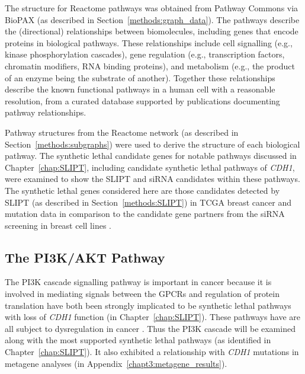 The  structure for Reactome \glspl{pathway} was obtained from Pathway Commons via \gls{BioPAX} (as described in Section~\ref{methods:graph_data}). The \glspl{pathway} describe the (directional) relationships between biomolecules, including genes that encode proteins in biological \glspl{pathway}. These relationships include cell signalling (e.g., kinase phosphorylation cascades), gene regulation (e.g., transcription factors, chromatin modifiers, \acrshort{RNA} binding proteins), and metabolism (e.g., the product of an enzyme being the substrate of another). Together these relationships describe the known functional \glspl{pathway} in a human cell with a reasonable resolution, from a curated database supported by publications documenting \gls{pathway} relationships. 

Pathway structures from the Reactome network (as described in Section~\ref{methods:subgraphs}) were used to derive the  structure of each biological \gls{pathway}. The \gls{synthetic lethal} candidate genes for notable \glspl{pathway} discussed in Chapter~\ref{chap:SLIPT}, including candidate \gls{synthetic lethal} \glspl{pathway} of \textit{CDH1}, were examined to show the \gls{SLIPT} and \gls{siRNA} candidates within these \glspl{pathway}. The \gls{synthetic lethal} genes considered here are those candidates detected by \gls{SLIPT} (as described in Section~\ref{methods:SLIPT}) in \gls{TCGA} breast cancer  and \gls{mutation} data \citep{TCGA2012} in comparison to the candidate gene partners from the \gls{siRNA} screening in breast cell lines \citep{Telford2015}. 

\FloatBarrier

\subsection{The PI3K/AKT Pathway}  \label{chapt4:SL_Genes_PI3K}

\FloatBarrier

The \acrfull{PI3K} cascade signalling \gls{pathway} is important in cancer because it is involved in mediating signals between the \glspl{GPCR} and regulation of protein translation have both been strongly implicated to be \gls{synthetic lethal} \glspl{pathway} with loss of \textit{CDH1} function (in Chapter~\ref{chap:SLIPT}). These \glspl{pathway} have are all subject to dysregulation in cancer \citep{Dorsam2007, Courtney2010, Gao2015}. Thus the PI3K cascade will be examined along with the most supported \gls{synthetic lethal} \glspl{pathway} (as identified in Chapter~\ref{chap:SLIPT}). It also exhibited a relationship with \textit{CDH1} mutations in \gls{metagene} analyses (in Appendix~\ref{chapt3:metagene_results}).

